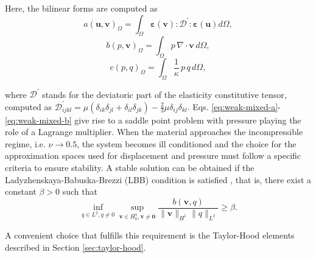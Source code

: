 \documentclass[english,11pt,3p,number,sort&compress]{elsarticle}
\begin{document}
\noindent Here, the bilinear forms are computed as
\begin{equation*}
	a\left(\bm{u},\bm{v}\right)_\Omega = \int_{\Omega} \bm{\varepsilon}(\bm{v}) : \mathcal{D}^{'} : \bm{\varepsilon}(\bm{u}) d\Omega ,
\end{equation*}
\begin{equation*}
	b\left(p, \bm{v}\right)_\Omega = \int_{\Omega} p \,\nabla \cdot \bm{v} \, d\Omega ,
\end{equation*}
\begin{equation*}
	c\left(p,q \right)_\Omega = \int_{\Omega} \frac{1}{\kappa} \,p \,q \, d\Omega ,
\end{equation*}

\noindent where $\mathcal{D}^{'}$ stands for the deviatoric part of the elasticity constitutive tensor, computed as $\mathcal{D}^{'}_{ijkl} = \mu(\delta_{ik}\delta_{jl}+\delta_{il}\delta_{jk})-\frac{2}{3}\mu\delta_{ij}\delta_{kl}$. Eqs. \eqref{eq:weak-mixed-a}-\eqref{eq:weak-mixed-b} give rise to a saddle point problem with pressure playing the role of a Lagrange multiplier. When the material approaches the incompressible regime, i.e. $\nu \rightarrow 0.5$, the system becomes ill conditioned and the choice for the approximation spaces used for displacement and pressure must follow a specific criteria to ensure stability. A stable solution can be obtained if the Ladyzhenskaya-Babuska-Brezzi (LBB) condition is satisfied \cite{brezzi2012mixed}, that is, there exist a constant $\beta>0$ such that
\begin{equation} \label{eq:LBB}
	\inf_{q \in L^2,q\neq0} \sup_{\bm{v} \in H^1_0,\bm{v}\neq\bm{0}} \frac{b\left(\bm{v},q\right)}{\|\bm{v}\|_{H^1} \|q\|_{L^2}} \geq \beta .
\end{equation}

\noindent A convenient choice that fulfills this requirement is the Taylor-Hood elements \cite{taylor1973numerical} described in Section \ref{sec:taylor-hood}.
\end{document}
